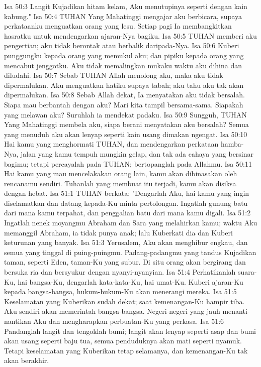 Isa 50:3  Langit Kujadikan hitam kelam, Aku menutupinya seperti dengan kain kabung."
Isa 50:4  TUHAN Yang Mahatinggi mengajar aku berbicara, supaya perkataanku menguatkan orang yang lesu. Setiap pagi Ia membangkitkan hasratku untuk mendengarkan ajaran-Nya bagiku.
Isa 50:5  TUHAN memberi aku pengertian; aku tidak berontak atau berbalik daripada-Nya.
Isa 50:6  Kuberi punggungku kepada orang yang memukul aku; dan pipiku kepada orang yang mencabut jenggotku. Aku tidak memalingkan mukaku waktu aku dihina dan diludahi.
Isa 50:7  Sebab TUHAN Allah menolong aku, maka aku tidak dipermalukan. Aku menguatkan hatiku supaya tabah; aku tahu aku tak akan dipermalukan.
Isa 50:8  Sebab Allah dekat, Ia menyatakan aku tidak bersalah. Siapa mau berbantah dengan aku? Mari kita tampil bersama-sama. Siapakah yang melawan aku? Suruhlah ia mendekat padaku.
Isa 50:9  Sungguh, TUHAN Yang Mahatinggi membela aku, siapa berani menyatakan aku bersalah? Semua yang menuduh aku akan lenyap seperti kain usang dimakan ngengat.
Isa 50:10  Hai kamu yang menghormati TUHAN, dan mendengarkan perkataan hamba-Nya, jalan yang kamu tempuh mungkin gelap, dan tak ada cahaya yang bersinar bagimu; tetapi percayalah pada TUHAN; bertopanglah pada Allahmu.
Isa 50:11  Hai kamu yang mau mencelakakan orang lain, kamu akan dibinasakan oleh rencanamu sendiri. Tuhanlah yang membuat itu terjadi, kamu akan disiksa dengan hebat.
Isa 51:1  TUHAN berkata: "Dengarlah Aku, hai kamu yang ingin diselamatkan dan datang kepada-Ku minta pertolongan. Ingatlah gunung batu dari mana kamu terpahat, dan penggalian batu dari mana kamu digali.
Isa 51:2  Ingatlah nenek moyangmu Abraham dan Sara yang melahirkan kamu; waktu Aku memanggil Abraham, ia tidak punya anak; lalu Kuberkati dia dan Kuberi keturunan yang banyak.
Isa 51:3  Yerusalem, Aku akan menghibur engkau, dan semua yang tinggal di puing-puingmu. Padang-padangmu yang tandus Kujadikan taman, seperti Eden, taman-Ku yang subur. Di situ orang akan bergirang dan bersuka ria dan bersyukur dengan nyanyi-nyanyian.
Isa 51:4  Perhatikanlah suara-Ku, hai bangsa-Ku, dengarlah kata-kata-Ku, hai umat-Ku. Kuberi ajaran-Ku kepada bangsa-bangsa, hukum-hukum-Ku akan menerangi mereka.
Isa 51:5  Keselamatan yang Kuberikan sudah dekat; saat kemenangan-Ku hampir tiba. Aku sendiri akan memerintah bangsa-bangsa. Negeri-negeri yang jauh menanti-nantikan Aku dan mengharapkan perbuatan-Ku yang perkasa.
Isa 51:6  Pandanglah langit dan tengoklah bumi; langit akan lenyap seperti asap dan bumi akan usang seperti baju tua, semua penduduknya akan mati seperti nyamuk. Tetapi keselamatan yang Kuberikan tetap selamanya, dan kemenangan-Ku tak akan berakhir.
